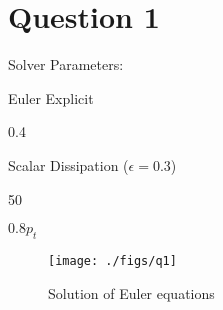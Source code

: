 \section{Question 1}
Solver Parameters:
\begin{description}[noitemsep]
    \item[Timestepping Scheme:] Euler Explicit
    \item[CFL:] 0.4
    \item[Spatial Scheme:] Scalar Dissipation ($\epsilon = 0.3$)
    \item[Grid Points:] 50
    \item[\pexit:] $0.8 p_t$
\end{description}

\begin{figure}[H]
    \centering
    \texttt{[image: ./figs/q1]}
    \caption{Solution of Euler equations}\label{fig:q1}
\end{figure}


